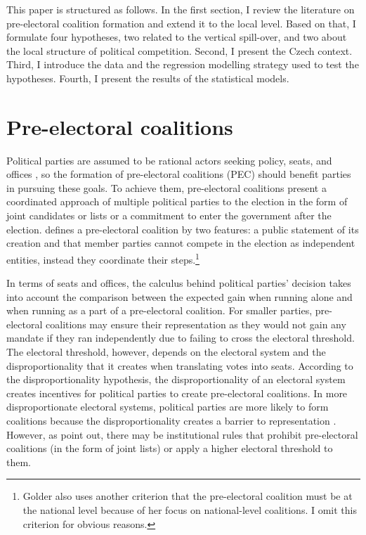 \documentclass[]{interact}
\theoremstyle{plain}%
\theoremstyle{definition}
\theoremstyle{remark}
\begin{document}
This paper is structured as follows. In the first section, I review the literature on pre-electoral coalition formation and extend it to the local level. Based on that, I formulate four hypotheses, two related to the vertical spill-over, and two about the local structure of political competition. Second, I present the Czech context. Third, I introduce the data and the regression modelling strategy used to test the hypotheses. Fourth, I present the results of the statistical models.

\section{Pre-electoral coalitions}

Political parties are assumed to be rational actors seeking policy, seats, and offices \citep{muller1999}, so the formation of pre-electoral coalitions (PEC) should benefit parties in pursuing these goals. To achieve them, pre-electoral coalitions present a coordinated approach of multiple political parties to the election in the form of joint candidates or lists or a commitment to enter the government after the election. \citet[12]{golder2006} defines a pre-electoral coalition by two features: a public statement of its creation and that member parties cannot compete in the election as independent entities, instead they coordinate their steps.\footnote{Golder also uses another criterion that the pre-electoral coalition must be at the national level because of her focus on national-level coalitions. I omit this criterion for obvious reasons.}

In terms of seats and offices, the calculus behind political parties' decision takes into account the comparison between the expected gain when running alone and when running as a part of a pre-electoral coalition. For smaller parties, pre-electoral coalitions may ensure their representation as they would not gain any mandate if they ran independently due to failing to cross the electoral threshold. The electoral threshold, however, depends on the electoral system and the disproportionality that it creates when translating votes into seats. According to the disproportionality hypothesis, the disproportionality of an electoral system creates incentives for political parties to create pre-electoral coalitions. In more disproportionate electoral systems, political parties are more likely to form coalitions because the disproportionality creates a barrier to representation \citep{golder2005}. However, as \citet{ibenskas2018} point out, there may be institutional rules that prohibit pre-electoral coalitions (in the form of joint lists) or apply a higher electoral threshold to them.
\end{document}
